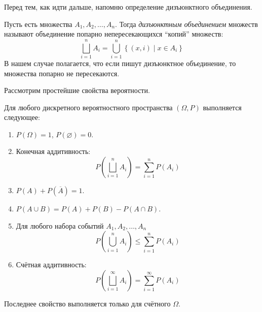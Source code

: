 \documentclass[a4paper,12pt]{article}
\begin{document}
Перед тем, как идти дальше, напомню определение дизъюнктного объединения.
\begin{definition}
Пусть есть множества \(A_1, A_2, \ldots, A_n\). Тогда \emph{дизъюнктным объединением} множеств называют объединение попарно непересекающихся ``копий'' множеств: \[\bigsqcup_{i = 1}^{n} A_i = \bigcup_{i = 1}^{n} \left\{(x, i) \mid x \in A_i\right\}\] В нашем случае полагается, что если пишут дизъюнктное объединение, то множества попарно не пересекаются.
\end{definition}

Рассмотрим простейшие свойства вероятности.
\begin{lemma}
Для любого дискретного вероятностного пространства \((\Omega, P)\) выполняется следующее:
\begin{enumerate}
    \item \(P(\Omega) = 1\), \(P(\varnothing) = 0\).
    \item Конечная аддитивность: \[P\left(\bigsqcup_{i = 1}^{n} A_i\right) = \sum_{i = 1}^{n} P(A_i)\]
    \item \(P(A) + P(\overline{A}) = 1\).
    \item \(P(A \cup B) = P(A) + P(B) - P(A \cap B)\).
    \item Для любого набора событий \(A_1, A_2, \ldots, A_n\) \[P\left(\bigcup_{i = 1}^{n} A_i\right) \leq \sum_{i = 1}^{n} P(A_i)\]
    \item Счётная аддитивность: \[P\left(\bigsqcup_{i = 1}^{\infty} A_i\right) = \sum_{i = 1}^{\infty} P(A_i)\]
\end{enumerate}
Последнее свойство выполняется только для счётного \(\Omega\).
\end{lemma}
\end{document}
